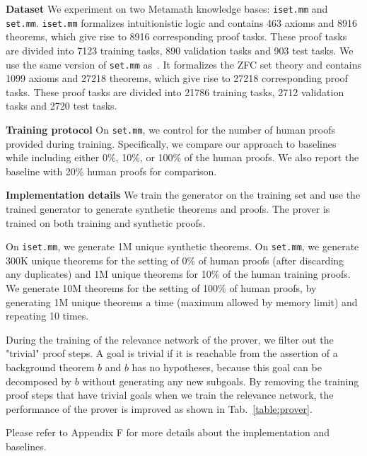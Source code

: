 \documentclass{article}
\begin{document}
\noindent\textbf{Dataset}
We experiment on two Metamath knowledge bases:  \texttt{iset.mm} and \texttt{set.mm}. 
\texttt{iset.mm} formalizes intuitionistic logic and 
contains 463 axioms and 8916 theorems, which give rise to 8916 corresponding proof tasks. These proof tasks are divided into 7123 training tasks, 890 validation tasks and 903 test tasks. 
We use the same version of \texttt{set.mm} as~\citet{whalen2016holophrasm}. 
It formalizes the ZFC set theory
and contains 1099 axioms and 27218 theorems, 
which give rise to 27218 corresponding proof tasks. These proof tasks are divided into 21786 training tasks, 2712 validation tasks and 2720 test tasks.

\noindent\textbf{Training protocol}
On \texttt{set.mm}, we control for the number of human proofs provided during training. Specifically, we compare our approach to baselines while including either 0\%, 10\%, or 100\% of the human proofs. We also report the baseline with 20\% human proofs for comparison.

\noindent\textbf{Implementation details}
We train the generator on the training set and use the trained generator to generate synthetic theorems and proofs. The prover is trained on both training and synthetic proofs.

On \texttt{iset.mm}, we generate 1M unique synthetic theorems. 
On \texttt{set.mm}, we generate 300K unique theorems for the setting of 0\% of human proofs (after discarding any duplicates) and 1M unique theorems for 10\% of the human training proofs. We generate 10M theorems for the setting of 100\% of human proofs, by generating 1M unique theorems a time (maximum allowed by memory limit) and repeating 10 times. 

During the training of the relevance network of the prover, 
we filter out the "trivial" proof steps.
A goal is trivial if it is reachable from the assertion of a background theorem $b$ and $b$ has no hypotheses, 
because this goal can be decomposed by $b$ without generating any new subgoals. 
By removing the training proof steps that have trivial goals
when we train the relevance network,
the performance of the prover is improved as shown in Tab.~\ref{table:prover}.

Please refer to 
Appendix F for more details
about the implementation and baselines.
\end{document}

